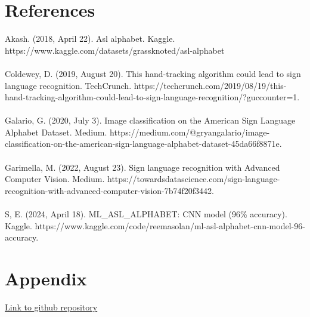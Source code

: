 \documentclass[10pt,twocolumn,letterpaper]{article}
\begin{document}



\section{References}
{\small


    Akash. (2018, April 22). Asl alphabet. Kaggle. https://www.kaggle.com/datasets/grassknoted/asl-alphabet 
    \\\\Coldewey, D. (2019, August 20). This hand-tracking algorithm could lead to sign language recognition. TechCrunch. https://techcrunch.com/2019/08/19/this-hand-tracking-algorithm-could-lead-to-sign-language-recognition/?guccounter=1. 
    \\\\Galario, G. (2020, July 3). Image classification on the American Sign Language Alphabet Dataset. Medium. https://medium.com/@gryangalario/image-classification-on-the-american-sign-language-alphabet-dataset-45da66f8871e.
    \\\\Garimella, M. (2022, August 23). Sign language recognition with Advanced Computer Vision. Medium. https://towardsdatascience.com/sign-language-recognition-with-advanced-computer-vision-7b74f20f3442.
    \\\\S, E. (2024, April 18). ML\_ASL\_ALPHABET: CNN model (96\% accuracy). Kaggle. https://www.kaggle.com/code/reemasolan/ml-asl-alphabet-cnn-model-96-accuracy.
}



\newpage
\section{Appendix}
\href{}{Link to github repository}
\end{document}
